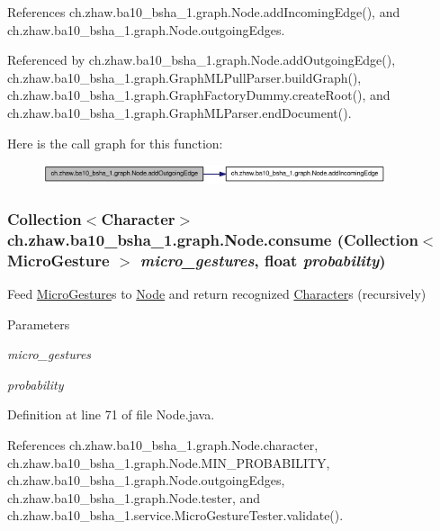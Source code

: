 References ch.zhaw.ba10\_\-bsha\_\-1.graph.Node.addIncomingEdge(), and ch.zhaw.ba10\_\-bsha\_\-1.graph.Node.outgoingEdges.

Referenced by ch.zhaw.ba10\_\-bsha\_\-1.graph.Node.addOutgoingEdge(), ch.zhaw.ba10\_\-bsha\_\-1.graph.GraphMLPullParser.buildGraph(), ch.zhaw.ba10\_\-bsha\_\-1.graph.GraphFactoryDummy.createRoot(), and ch.zhaw.ba10\_\-bsha\_\-1.graph.GraphMLParser.endDocument().

Here is the call graph for this function:\nopagebreak
\begin{figure}[H]
\begin{center}
\leavevmode
\includegraphics[width=286pt]{classch_1_1zhaw_1_1ba10__bsha__1_1_1graph_1_1Node_a898dcdd240251792e45ea79352536dce_cgraph}
\end{center}
\end{figure}
\hypertarget{classch_1_1zhaw_1_1ba10__bsha__1_1_1graph_1_1Node_a985b135e0ae7c0453985cd1dacdc4bc7}{
\subsubsection[{consume}]{\setlength{\rightskip}{0pt plus 5cm}Collection$<${\bf Character}$>$ ch.zhaw.ba10\_\-bsha\_\-1.graph.Node.consume (Collection$<$ {\bf MicroGesture} $>$ {\em micro\_\-gestures}, \/  float {\em probability})}}
\label{classch_1_1zhaw_1_1ba10__bsha__1_1_1graph_1_1Node_a985b135e0ae7c0453985cd1dacdc4bc7}
Feed \hyperlink{}{MicroGesture}s to \hyperlink{classch_1_1zhaw_1_1ba10__bsha__1_1_1graph_1_1Node}{Node} and return recognized \hyperlink{classch_1_1zhaw_1_1ba10__bsha__1_1_1Character}{Character}s (recursively)


\begin{DoxyParams}{Parameters}
\item[{\em micro\_\-gestures}]\item[{\em probability}]\end{DoxyParams}


Definition at line 71 of file Node.java.

References ch.zhaw.ba10\_\-bsha\_\-1.graph.Node.character, ch.zhaw.ba10\_\-bsha\_\-1.graph.Node.MIN\_\-PROBABILITY, ch.zhaw.ba10\_\-bsha\_\-1.graph.Node.outgoingEdges, ch.zhaw.ba10\_\-bsha\_\-1.graph.Node.tester, and ch.zhaw.ba10\_\-bsha\_\-1.service.MicroGestureTester.validate().

